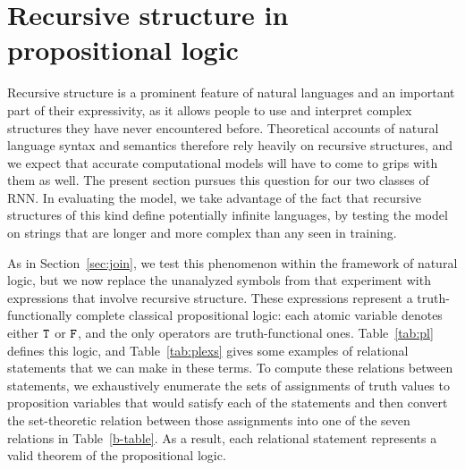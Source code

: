 \section{Recursive structure in propositional logic}\label{sec:recursion}

Recursive structure is a prominent feature of natural languages and
an important part of their expressivity, as it allows people to use
and interpret complex structures they have never encountered before.
Theoretical accounts of natural language syntax and semantics
therefore rely heavily on recursive structures, and we expect that
accurate computational models will have to come to grips with them as
well. The present section pursues this question for our two classes of
RNN. In evaluating the model, we take advantage of the fact that
recursive structures of this kind define potentially infinite
languages, by testing the model on strings that are longer and more
complex than any seen in training.


As in Section~\ref{sec:join}, we test this phenomenon within the
framework of natural logic, but we now replace the unanalyzed symbols
from that experiment with expressions that involve recursive
structure. These expressions represent a truth-functionally complete classical
propositional logic: each atomic variable denotes either $\texttt{T}$ or
$\texttt{F}$, and the only operators are truth-functional ones.
Table~\ref{tab:pl} defines this logic, and Table~\ref{tab:plexs} gives
some examples of relational statements that we can make
in these terms. To compute these relations between statements, we
exhaustively enumerate the sets of assignments of truth values to
proposition variables that would satisfy each of the statements and
then convert the set-theoretic relation between those assignments into
one of the seven relations in Table~\ref{b-table}. As a result, each relational
statement represents a valid theorem of the propositional logic.

